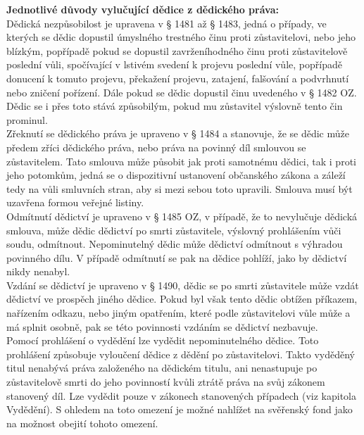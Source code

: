 \documentclass{article}
\begin{document}
\noindent\textbf{Jednotlivé důvody vylučující dědice z dědického práva:} \\

Dědická nezpůsobilost je upravena v § 1481 až § 1483, jedná o případy, ve kterých se dědic dopustil úmyslného trestného činu proti zůstavitelovi, nebo jeho blízkým, popřípadě pokud se dopustil zavrženíhodného činu proti zůstavitelově poslední vůli, spočívající v lstivém svedení k projevu poslední vůle, popřípadě donucení k tomuto projevu, překažení projevu, zatajení, falšování a podvrhnutí nebo zničení pořízení. Dále pokud se dědic dopustil činu uvedeného v § 1482 OZ. Dědic se i přes toto stává způsobilým, pokud mu zůstavitel výslovně tento čin prominul. \\

Zřeknutí se dědického práva je upraveno v § 1484 a stanovuje, že se dědic může předem zříci dědického práva, nebo práva na povinný díl smlouvou se zůstavitelem. Tato smlouva může působit jak proti samotnému dědici, tak i proti jeho potomkům, jedná se o dispozitivní ustanovení občanského zákona a záleží tedy na vůli smluvních stran, aby si mezi sebou toto upravili. Smlouva musí být uzavřena formou veřejné listiny. \\

Odmítnutí dědictví je upraveno v § 1485 OZ, v případě, že to nevylučuje dědická smlouva, může dědic dědictví po smrti zůstavitele, výslovný prohlášením vůči soudu, odmítnout. Nepominutelný dědic může dědictví odmítnout s výhradou povinného dílu. V případě odmítnutí se pak na dědice pohlíží, jako by dědictví nikdy nenabyl.\\

Vzdání se dědictví je upraveno v § 1490, dědic se po smrti zůstavitele může vzdát dědictví ve prospěch jiného dědice. Pokud byl však tento dědic obtížen příkazem, nařízením odkazu, nebo jiným opatřením, které podle zůstavitelovi vůle může a má splnit osobně, pak se této povinnosti vzdáním se dědictví nezbavuje.\\

Pomocí prohlášení o vydědění lze vydědit nepominutelného dědice. Toto prohlášení způsobuje vyloučení dědice z dědění po zůstavitelovi. Takto vyděděný titul nenabývá práva založeného na dědickém titulu, ani nenastupuje po zůstavitelově smrti do jeho povinností kvůli ztrátě práva na svůj zákonem stanovený díl. Lze vydědit pouze v zákonech stanovených případech (viz kapitola Vydědění). S ohledem na toto omezení je možné nahlížet na svěřenský fond jako na možnost obejití tohoto omezení.\\
\end{document}

